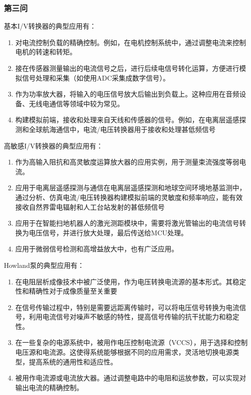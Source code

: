 \documentclass[./测控三级项目.tex]{subfiles} %
\begin{document}
		\subsubsection{第三问}
			基本I/V转换器的典型应用有：
			\begin{enumerate}
				\item 对电流控制负载的精确控制。例如，在电机控制系统中，通过调整电流来控制电机的转速和转矩。
				\item 接在传感器测量输出的电流信号之后，进行后续电信号转化运算，方便进行模拟信号处理和采集（如使用ADC采集成数字信号）。
				\item 作为功率放大器，将输入的电压信号放大后输出到负载上。这种应用在音频设备、无线电通信等领域中较为常见。
				\item 构建模拟前端，接收和处理来自天线和传感器的信号。例如，在电离层遥感探测和全球航海通信中，电流/电压转换器用于接收和处理甚低频信号
			\end{enumerate}
			高敏感I/V转换器的典型应用有：
			\begin{enumerate}
			\item 作为高输入阻抗和高灵敏度运算放大器的应用实例，用于测量束流强度等弱电流。
			\item 应用于电离层遥感探测与通信在电离层遥感探测和地球空间环境地基监测中，通过分析、仿真电流/电压转换器构建模拟前端的灵敏度和频率响应，能有效接收自然界雷电辐射和人工台站发射的甚低频信号
			\item 应用于在智能扫地机器人的激光测距模块中，需要将激光管输出的电流信号转换为电压信号，并进行放大处理，最后传送给MCU处理。
			\item 应用于微弱信号检测和高增益放大中，也有广泛应用。
			\end{enumerate}
			Howland泵的典型应用有：
			\begin{enumerate}
				\item 在电阻层析成像技术中被广泛使用，作为电压转换电流源的基本形式。其稳定性和精确性对于成像质量至关重要
				\item 在信号传输过程中，特别是需要远距离传输时，可以将电压信号转换为电流信号，利用电流信号对噪声不敏感的特性，提高信号传输的抗干扰能力和稳定性。
				\item 在一些复杂的电源系统中，被用作电压控制电流源（VCCS），用于选择和控制电压源和电流源。这使得系统能够根据不同的应用需求，灵活地切换电源类型，提高系统的通用性和适应性。
				\item 被用作电流源或电流放大器。通过调整电路中的电阻和运放参数，可以实现对输出电流的精确控制。
			\end{enumerate}
			
\end{document}
